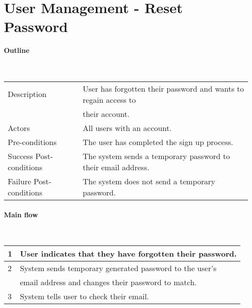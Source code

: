 \section*{User Management - Reset Password} %

\paragraph*{Outline} \

\begin{tabular}{ | l | l | }
\hline
Description & User has forgotten their password and wants to regain access to  \\
  & their account. \\ \hline
Actors & All users with an account. \\ \hline
Pre-conditions & The user has completed the sign up process. \\ \hline
Success Post-conditions & The system sends a temporary password to their email address. \\ \hline
Failure Post-conditions & The system does not send a temporary password. \\ \hline
\end{tabular}


\paragraph*{Main flow} \

\begin{tabular}{ | l | l | } \hline
1 & User indicates that they have forgotten their password. \\ \hline
2 & System sends temporary generated password to the user's  \\
  & email address and changes their password to match. \\ \hline
3 & System tells user to check their email. \\ \hline
\end{tabular}
